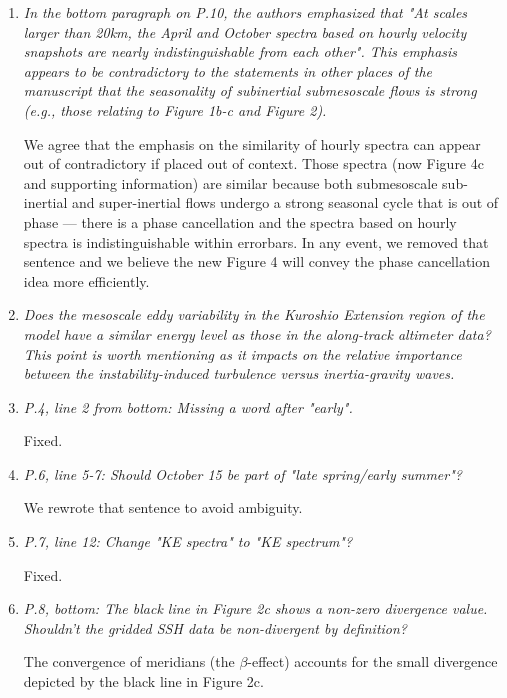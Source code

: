 \documentclass[11pt]{article}
\newcommand{\bdp}{\begin{description}}
\newcommand{\edp}{\end{description}}
\begin{document}
\begin{enumerate}


\item {\it In the bottom paragraph on P.10, the authors emphasized that "At scales larger
than 20km, the April and October spectra based on hourly velocity snapshots are
nearly indistinguishable from each other". This emphasis appears to be contradictory
to the statements in other places of the manuscript that the seasonality of subinertial
submesoscale flows is strong (e.g., those relating to Figure 1b-c and Figure 2).}\\

    \bdp
        We agree that the emphasis on the similarity of hourly spectra can appear
        out of contradictory if placed out of context. Those spectra (now Figure 4c
        and supporting information) are similar because both submesoscale sub-inertial
        and super-inertial flows undergo a strong seasonal cycle that is out of
        phase --- there is a phase cancellation and the spectra based on hourly
        spectra is indistinguishable within errorbars. In any event, we removed
        that sentence and we believe the new Figure 4 will convey
        the phase cancellation idea more efficiently.
    \edp

\item {\it Does the mesoscale eddy variability in the Kuroshio Extension region of the model
have a similar energy level as those in the along-track altimeter data? This point
is worth mentioning as it impacts on the relative importance between the instability-induced
turbulence versus inertia-gravity waves.}

\item {\it P.4, line 2 from bottom: Missing a word after "early".}

  Fixed.

\item {\it P.6, line 5-7: Should October 15 be part of "late spring/early summer"?}

  We rewrote that sentence to avoid ambiguity.

\item {\it P.7, line 12: Change "KE spectra" to "KE spectrum"?}

Fixed.

\item {\it P.8, bottom: The black line in Figure 2c shows a non-zero divergence value.
      Shouldn't the gridded SSH data be non-divergent by definition?}

  \bdp
    The convergence of meridians (the $\beta$-effect) accounts for the
    small divergence depicted by the black line in Figure 2c.
  \edp


\end{enumerate}
\end{document}
